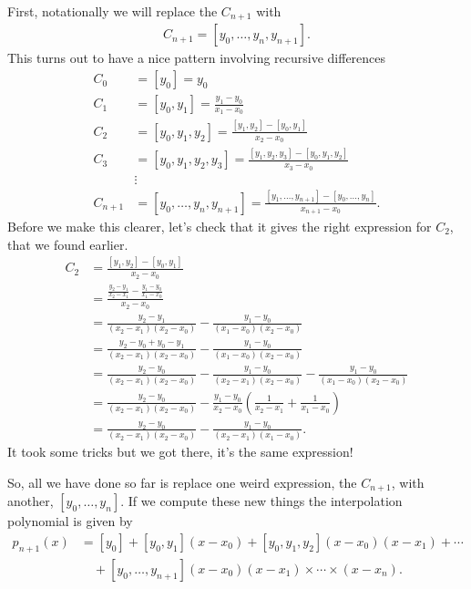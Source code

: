 First, notationally we will replace the $C_{n+1}$ with
\begin{align*}
C_{n+1} = [y_0,\dots,y_n,y_{n+1}].
\end{align*}
This turns out to have a nice pattern involving recursive differences
\begin{align*}
C_0 &= [y_0] = y_0 \\
%
C_1 &= [y_0,y_1] = \frac{y_1 - y_0}{x_1-x_0} \\
%
C_2 &= [y_0,y_1,y_2] = \frac{[y_1,y_2] - [y_0,y_1]}{x_2-x_0} \\
%
C_3 &= [y_0,y_1,y_2,y_3] = \frac{[y_1,y_2,y_3] - [y_0,y_1,y_2]}{x_3-x_0} \\
%
&\vdots \\
%
C_{n+1} &= [y_0,\dots,y_n,y_{n+1}] = \frac{[y_1,\dots,y_{n+1}] - [y_0,\dots,y_{n}]}{x_{n+1}-x_0}.
\end{align*}
Before we make this clearer, let's check that it gives the right expression for $C_2$, that we found earlier.
\begin{align*}
C_2 &= \frac{[y_1,y_2] - [y_0,y_1]}{x_2-x_0} \\
%
&= \frac{\frac{y_2 - y_1}{x_2-x_1}  - \frac{y_1 - y_0}{x_1-x_0} }{x_2-x_0}  \\
%
&= \frac{y_2 - y_1}{(x_2-x_1)(x_2-x_0)} - \frac{y_1 - y_0 }{(x_1-x_0)(x_2-x_0)} \\
%
&= \frac{y_2 - y_0 + y_0 - y_1}{(x_2-x_1)(x_2-x_0)} - \frac{y_1 - y_0 }{(x_1-x_0)(x_2-x_0)}    \\
%
&= \frac{y_2 - y_0}{(x_2-x_1)(x_2-x_0)}- \frac{y_1 - y_0}{(x_2-x_1)(x_2-x_0)} - \frac{y_1 - y_0 }{(x_1-x_0)(x_2-x_0)} \\
%
&= \frac{y_2 - y_0}{(x_2-x_1)(x_2-x_0)}- \frac{y_1 - y_0}{x_2-x_0}\left(\frac{1}{x_2-x_1} +\frac{1}{x_1-x_0} \right) \\
%
&= \frac{y_2 - y_0}{(x_2-x_1)(x_2-x_0)}- \frac{y_1 - y_0}{(x_2-x_1)(x_1-x_0)}.
\end{align*}
It took some tricks but we got there, it's the same expression!

So, all we have done so far is replace one weird expression, the $C_{n+1}$, with another, $[y_0,\dots,y_n]$. If we compute these new things the interpolation polynomial is given by
\begin{align*}
p_{n+1}(x) &= [y_0] + [y_0,y_1](x-x_0) + [y_0,y_1,y_2](x-x_0)(x-x_1) + \cdots \\
& \quad + [y_0,\dots,y_{n+1}](x-x_0)(x-x_1)\times \cdots \times (x-x_n).
\end{align*}

